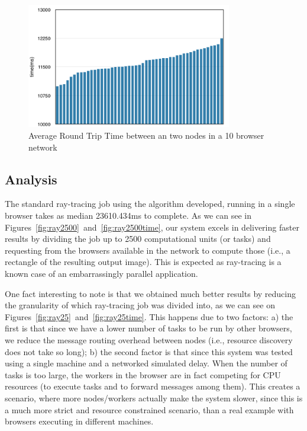 \begin{figure}[h!]
  \centering
  \includegraphics[width=0.8\textwidth]{figs/rtt.png}
  \caption{Average Round Trip Time between an two nodes in a 10 browser network}
  \label{fig:rtt}
\end{figure}

\subsection{Analysis}

The standard ray-tracing job using the algorithm developed, running in a single browser takes as median 23610.434ms to complete. As we can see in Figures~\ref{fig:ray2500}~and~\ref{fig:ray2500time}, our system excels in delivering faster results by dividing the job up to 2500 computational units (or tasks) and requesting from the browsers available in the network to compute those (i.e., a rectangle of the resulting output image). This is expected as ray-tracing is a known case of an embarrassingly parallel application.

One fact interesting to note is that we obtained much better results by reducing the granularity of which ray-tracing job was divided into, as we can see on Figures~\ref{fig:ray25}~and~\ref{fig:ray25time}. This happens due to two factors: a) the first is that since we have a lower number of tasks to be run by other browsers, we reduce the message routing overhead between nodes (i.e., resource discovery does not take so long); b) the second factor is that since this system was tested using a single machine and a networked simulated delay. When the number of tasks is too large, the workers in the browser are in fact competing for CPU resources (to execute tasks and to forward messages among them). This creates a scenario, where more nodes/workers actually  make the system slower, since this is a much more strict and resource constrained scenario, than a real example with browsers executing in different machines.

